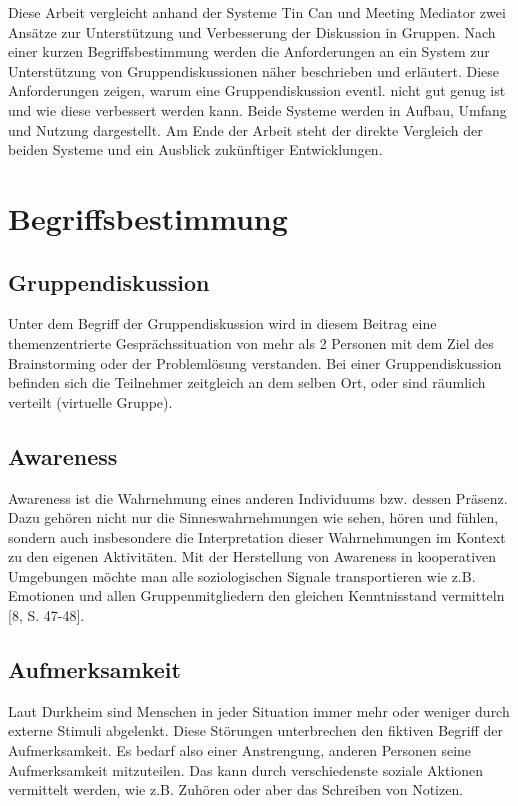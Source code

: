 \documentclass{seminarvorlage}
\begin{document}
Diese Arbeit vergleicht anhand der Systeme Tin Can \cite{HarGorSch2012} und
Meeting Mediator \cite{KimChaHolPent2008} zwei Ansätze zur Unterstützung und
Verbesserung der Diskussion in Gruppen.
Nach einer kurzen Begriffsbestimmung werden die Anforderungen an ein System zur
Unterstützung von Gruppendiskussionen näher beschrieben und erläutert. Diese
Anforderungen zeigen, warum eine Gruppendiskussion eventl.
nicht gut genug ist und wie diese verbessert werden kann. Beide Systeme werden
in Aufbau, Umfang und Nutzung dargestellt. Am Ende der Arbeit steht der
direkte Vergleich der beiden Systeme und ein Ausblick zu\-künf\-ti\-ger
Entwicklungen.


\section{Begriffsbestimmung}
\subsection{Gruppendiskussion}
Unter dem Begriff der Gruppendiskussion wird in diesem Beitrag
eine themenzentrierte Ge\-sprächs\-situa\-tion von mehr als 2 Personen mit dem
Ziel des Brainstorming oder der Problemlösung verstanden. Bei einer Gruppendiskussion befinden
sich die Teilnehmer zeitgleich an dem selben Ort, oder sind räumlich verteilt
(virtuelle Gruppe).

\subsection{Awareness}
Awareness ist die Wahrnehmung eines anderen Individuums bzw. dessen Präsenz.
Dazu gehören nicht nur die Sinneswahrnehmungen wie sehen, hören und fühlen,
sondern auch insbesondere die Interpretation dieser Wahrnehmungen im Kontext zu
den eigenen Aktivitäten.
Mit der Herstellung von Awareness in kooperativen Umgebungen mö\-chte man alle
soziologischen Signale transportieren wie z.B. Emotionen und allen
Gruppenmitgliedern den gleichen Kenntnisstand vermitteln [8, S. 47-48].

\subsection{Aufmerksamkeit}
Laut Durkheim \cite{Dur1974} sind Menschen in jeder Situation immer mehr oder weniger
durch externe Stimuli abgelenkt. Diese Stör\-un\-gen unterbrechen den fiktiven
Begriff der Aufmerksamkeit. Es bedarf also einer Anstrengung, anderen Personen
seine Aufmerksamkeit mitzuteilen. Das kann durch verschiedenste soziale Aktionen
vermittelt werden, wie z.B. Zuhören oder aber das Schreiben von Notizen.
\end{document}
